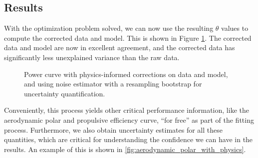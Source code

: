 \documentclass[conf]{new-aiaa}
\begin{document}
    \subsection{Results}

    With the optimization problem solved, we can now use the resulting $\theta$ values to compute the corrected data and model. This is shown in Figure \ref{fig:power_curve_with_physics}. The corrected data and model are now in excellent agreement, and the corrected data has significantly less unexplained variance than the raw data.

    \begin{figure}[!htb]
        \centering
        \caption{Power curve with physics-informed corrections on data and model, and using noise estimator with a resampling bootstrap for uncertainty quantification.}
        \label{fig:power_curve_with_physics}
    \end{figure}

    Conveniently, this process yields other critical performance information, like the aerodynamic polar and propulsive efficiency curve, ``for free'' as part of the fitting process. Furthermore, we also obtain uncertainty estimates for all these quantities, which are critical for understanding the confidence we can have in the results. An example of this is shown in \ref{fig:aerodynamic_polar_with_physics}.
\end{document}
